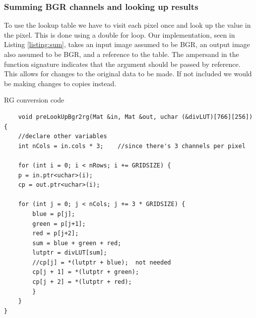 \subsubsection{Summing BGR channels and looking up results}
To use the lookup table we have to visit each pixel once and look up the value in the pixel. This is done using a double for loop. Our implementation, seen in Listing \ref{listing:sum}, takes an input image assumed to be BGR, an output image also assumed to be BGR, and a reference to the table. The ampersand \codeword{&} in the function signature indicates that the argument should be passed by reference. This allows for changes to the original data to be made. If not included we would be making changes to copies instead. \\
\begin{listing}[H]
	\caption{RG conversion code}
	\label{listing:sum}
	\begin{verbatim}
	void preLookUpBgr2rg(Mat &in, Mat &out, uchar (&divLUT)[766][256]) {
	//declare other variables
	int nCols = in.cols * 3;	//since there's 3 channels per pixel
	
	for (int i = 0; i < nRows; i += GRIDSIZE) {
	p = in.ptr<uchar>(i);
	cp = out.ptr<uchar>(i);
	
	for (int j = 0; j < nCols; j += 3 * GRIDSIZE) {
		blue = p[j];
		green = p[j+1];
		red = p[j+2];
		sum = blue + green + red;
		lutptr = divLUT[sum];
		//cp[j] = *(lutptr + blue);  not needed
		cp[j + 1] = *(lutptr + green);
		cp[j + 2] = *(lutptr + red);
		}
	}
}
	\end{verbatim}
\end{listing}
